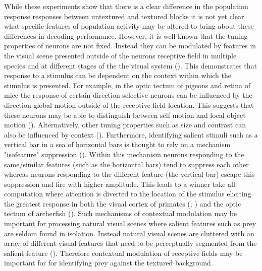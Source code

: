 While these experiments show that there is a clear difference in the population response responses between untextured and textured blocks it is not yet clear what specific features of population activity may be altered to bring about these differences in decoding performance.  However, it is well known that the tuning properties of neurons are not fixed. Instead they can be modulated by features in the visual scene presented outside of the neurons receptive field in multiple species and at different stages of the the visual system (\cite{Krause2014ContextualCortex,Allman1985StimulusNeurons}). This demonstrates that response to a stimulus can be dependent on the context within which the stimulus is presented.  For example, in the optic tectum of pigeons and retina of mice the response of certain direction selective neurons can be influenced by the direction global motion outside of the receptive field location. This suggests that these neurons may be able to distinguish between self motion and local object motion (\cite{Sun2002ContextualPigeons, Sun2006ONRetina}).  Alternatively, other tuning properties such as size and contrast can also be influenced by context (\cite{Krause2014ContextualCortex, Ziemba2018ContextualV2}). Furthermore, identifying salient stimuli such as a vertical bar in a sea of horizontal bars is thought to rely on a mechanism "isofeature" suppression (\cite{Zhaoping2016FromNeuroscience}). Within this mechanism neurons responding to the same/similar features (such as the horizontal bars) tend to suppress each other whereas neurons responding to the different feature (the vertical bar) escape this suppression and fire with higher amplitude.  This leads to a winner take all computation where attention is diverted to the location of the stimulus eliciting the greatest response in both the visual cortex of primates (\cite{Zhaoping2012PropertiesBehavior}; \cite{Allman1985StimulusNeurons}) and the optic tectum of archerfish (\cite{Ben-Tov2015Pop-outFish}).  Such mechanisms of contextual modulation may be important for processing natural visual scenes where salient features such as prey are seldom found in isolation.  Instead natural visual scenes are cluttered with an array of different visual features that need to be perceptually segmented from the salient feature (\cite{Zhaoping2016FromNeuroscience}). Therefore contextual modulation of receptive fields may be important for for identifying prey against the textured background. 

